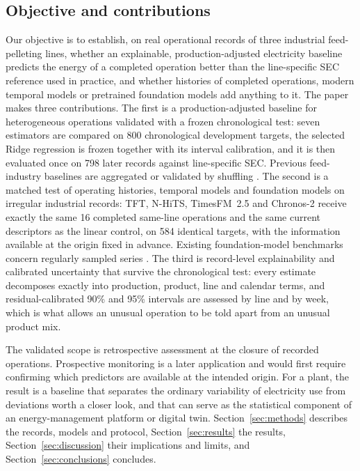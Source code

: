 \subsection{Objective and contributions}\label{sec:contrib}
Our objective is to establish, on real operational records of three industrial feed-pelleting lines, whether an explainable, production-adjusted electricity baseline predicts the energy of a completed operation better than the line-specific SEC reference used in practice, and whether histories of completed operations, modern temporal models or pretrained foundation models add anything to it. The paper makes three contributions. The first is a production-adjusted baseline for heterogeneous operations validated with a frozen chronological test: seven estimators are compared on 800 chronological development targets, the selected Ridge regression is frozen together with its interval calibration, and it is then evaluated once on 798 later records against line-specific SEC. Previous feed-industry baselines are aggregated \citep{sanchez2020} or validated by shuffling \citep{ekwaro2025}. The second is a matched test of operating histories, temporal models and foundation models on irregular industrial records: TFT, N-HiTS, TimesFM~2.5 and Chronos-2 receive exactly the same 16 completed same-line operations and the same current descriptors as the linear control, on 584 identical targets, with the information available at the origin fixed in advance. Existing foundation-model benchmarks concern regularly sampled series \citep{obermeier2026,miseta2026,lin2026}. The third is record-level explainability and calibrated uncertainty that survive the chronological test: every estimate decomposes exactly into production, product, line and calendar terms, and residual-calibrated 90\% and 95\% intervals are assessed by line and by week, which is what allows an unusual operation to be told apart from an unusual product mix.

The validated scope is retrospective assessment at the closure of recorded operations. Prospective monitoring is a later application and would first require confirming which predictors are available at the intended origin. For a plant, the result is a baseline that separates the ordinary variability of electricity use from deviations worth a closer look, and that can serve as the statistical component of an energy-management platform or digital twin. Section~\ref{sec:methods} describes the records, models and protocol, Section~\ref{sec:results} the results, Section~\ref{sec:discussion} their implications and limits, and Section~\ref{sec:conclusions} concludes.
